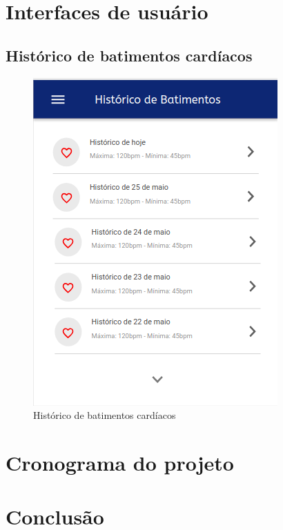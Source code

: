 \documentclass[
	12pt,				%
	openright,			%
	oneside,			%
	a4paper,			%
	english,			%
	french,				%
	spanish,			%
	brazil				%
]{abntex2}
\begin{document}
\chapter{Interfaces de usuário}
\section{Histórico de batimentos cardíacos}
\begin{figure}[h]	
	\label{figure_cardiac_activity_history}	
	\includegraphics[scale=0.8]{interfaces/cardiac_history.png}
	\caption{ Histórico de batimentos cardíacos }
	\hfill
\end{figure}
%
\chapter{Cronograma do projeto}
\chapter{Conclusão}

\postextual

\end{document}
